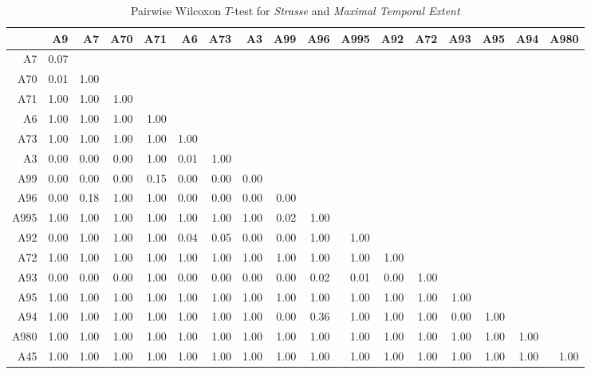\begin{table}[ht!]
	\tiny
	\setlength{\tabcolsep}{4pt}
	\centering
  \begin{tabular}{rrrrrrrrrrrrrrrrr}
    \hline
         & A9 & A7 & A70 & A71 & A6 & A73 & A3 & A99 & A96 & A995 & A92 & A72 & A93 & A95 & A94 & A980 \\ 
    \hline
    A7   & 0.07 &  &  &  &  &  &  &  &  &  &  &  &  &  &  &  \\ 
    A70  & 0.01 & 1.00 &  &  &  &  &  &  &  &  &  &  &  &  &  &  \\ 
    A71  & 1.00 & 1.00 & 1.00 &  &  &  &  &  &  &  &  &  &  &  &  &  \\ 
    A6   & 1.00 & 1.00 & 1.00 & 1.00 &  &  &  &  &  &  &  &  &  &  &  &  \\ 
    A73  & 1.00 & 1.00 & 1.00 & 1.00 & 1.00 &  &  &  &  &  &  &  &  &  &  &  \\ 
    A3   & 0.00 & 0.00 & 0.00 & 1.00 & 0.01 & 1.00 &  &  &  &  &  &  &  &  &  &  \\ 
    A99  & 0.00 & 0.00 & 0.00 & 0.15 & 0.00 & 0.00 & 0.00 &  &  &  &  &  &  &  &  &  \\ 
    A96  & 0.00 & 0.18 & 1.00 & 1.00 & 0.00 & 0.00 & 0.00 & 0.00 &  &  &  &  &  &  &  &  \\ 
    A995 & 1.00 & 1.00 & 1.00 & 1.00 & 1.00 & 1.00 & 1.00 & 0.02 & 1.00 &  &  &  &  &  &  &  \\ 
    A92  & 0.00 & 1.00 & 1.00 & 1.00 & 0.04 & 0.05 & 0.00 & 0.00 & 1.00 & 1.00 &  &  &  &  &  &  \\ 
    A72  & 1.00 & 1.00 & 1.00 & 1.00 & 1.00 & 1.00 & 1.00 & 1.00 & 1.00 & 1.00 & 1.00 &  &  &  &  &  \\ 
    A93  & 0.00 & 0.00 & 0.00 & 1.00 & 0.00 & 0.00 & 0.00 & 0.00 & 0.02 & 0.01 & 0.00 & 1.00 &  &  &  &  \\ 
    A95  & 1.00 & 1.00 & 1.00 & 1.00 & 1.00 & 1.00 & 1.00 & 1.00 & 1.00 & 1.00 & 1.00 & 1.00 & 1.00 &  &  &  \\ 
    A94  & 1.00 & 1.00 & 1.00 & 1.00 & 1.00 & 1.00 & 1.00 & 0.00 & 0.36 & 1.00 & 1.00 & 1.00 & 0.00 & 1.00 &  &  \\ 
    A980 & 1.00 & 1.00 & 1.00 & 1.00 & 1.00 & 1.00 & 1.00 & 1.00 & 1.00 & 1.00 & 1.00 & 1.00 & 1.00 & 1.00 & 1.00 &  \\ 
    A45  & 1.00 & 1.00 & 1.00 & 1.00 & 1.00 & 1.00 & 1.00 & 1.00 & 1.00 & 1.00 & 1.00 & 1.00 & 1.00 & 1.00 & 1.00 & 1.00 \\ 
    \hline
  \end{tabular}
	\caption{Pairwise Wilcoxon $T$-test for \textit{Strasse} and \textit{Maximal Temporal Extent}}
	\label{tbl:wilcoxon_baysis_matched_Strasse_TMax}
\end{table}
